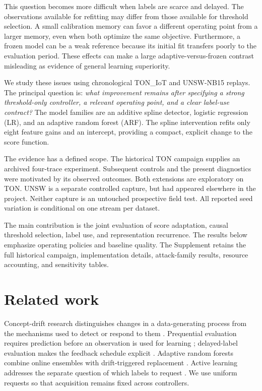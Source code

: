 This question becomes more difficult when labels are scarce and delayed. The observations available for refitting may differ from those available for threshold selection. A small calibration memory can favor a different operating point from a larger memory, even when both optimize the same objective. Furthermore, a frozen model can be a weak reference because its initial fit transfers poorly to the evaluation period. These effects can make a large adaptive-versus-frozen contrast misleading as evidence of general learning superiority.

We study these issues using chronological TON\_IoT and UNSW-NB15 replays. The principal question is: \emph{what improvement remains after specifying a strong threshold-only controller, a relevant operating point, and a clear label-use contract?} The model families are an additive spline detector, logistic regression (LR), and an adaptive random forest (ARF). The spline intervention refits only eight feature gains and an intercept, providing a compact, explicit change to the score function.

The evidence has a defined scope. The historical TON campaign supplies an archived four-trace experiment. Subsequent controls and the present diagnostics were motivated by its observed outcomes. Both extensions are exploratory on TON. UNSW is a separate controlled capture, but had appeared elsewhere in the project. Neither capture is an untouched prospective field test. All reported seed variation is conditional on one stream per dataset.

The main contribution is the joint evaluation of score adaptation, causal threshold selection, label use, and representation recurrence. The results below emphasize operating policies and baseline quality. The Supplement retains the full historical campaign, implementation details, attack-family results, resource accounting, and sensitivity tables.

\section{Related work}
Concept-drift research distinguishes changes in a data-generating process from the mechanisms used to detect or respond to them \citep{gama2014}. Prequential evaluation requires prediction before an observation is used for learning \citep{gama2013}; delayed-label evaluation makes the feedback schedule explicit \citep{grzenda2020}. Adaptive random forests combine online ensembles with drift-triggered replacement \citep{gomes2017}. Active learning addresses the separate question of which labels to request \citep{zliobaite2014}. We use uniform requests so that acquisition remains fixed across controllers.

